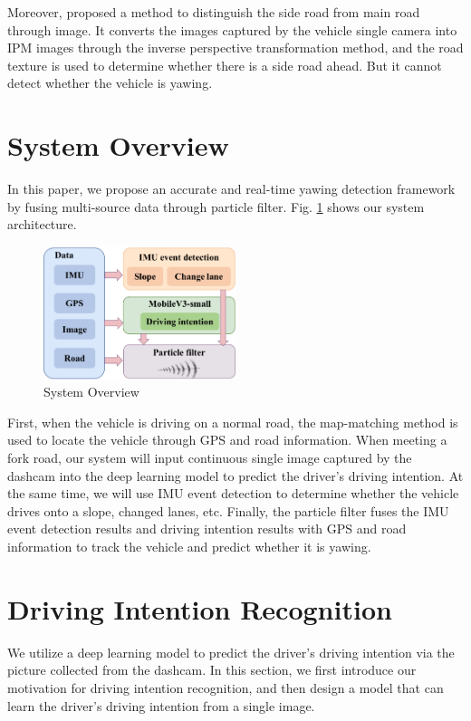 \documentclass[journal]{IEEEtran}
\begin{document}
Moreover, \cite{kikuchi2014occluded} proposed a method to distinguish the side road from main road through image. It converts the images captured by the vehicle single camera into IPM images through the inverse perspective transformation method, and the road texture is used to determine whether there is a side road ahead. But it cannot detect whether the vehicle is yawing.

\section{System Overview}\label{sec:overview}
In this paper, we propose an accurate and real-time yawing detection framework by fusing multi-source data through particle filter. 
Fig. \ref{fig:SystemOverview} shows our system architecture.

\begin{figure}[htbp]
    \centerline{\includegraphics[width=0.5\textwidth]{fig/SystemOverview1.pdf}}
    \caption{System Overview}
    \label{fig:SystemOverview}
\end{figure}

First, when the vehicle is driving on a normal road, the map-matching method is used to locate the vehicle through GPS and road information. When meeting a fork road, our system will input continuous single image captured by the dashcam into the deep learning model to predict the driver's driving intention. At the same time, we will use IMU event detection to determine whether the vehicle drives onto a slope, changed lanes, etc. Finally, the particle filter fuses the IMU event detection results and driving intention results with GPS and road information to track the vehicle and predict whether it is yawing. 

\section{Driving Intention Recognition}\label{sec:image}
We utilize a deep learning model to predict the driver's driving intention via the picture collected from the dashcam.
In this section, we first introduce our motivation for driving intention recognition, and then design a model that can learn the driver's driving intention from a single image.
\end{document}
